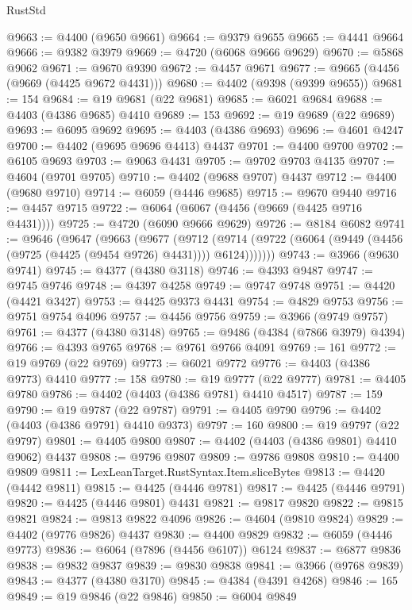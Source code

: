\begin{lexlean}{RustStd}
\begin{coremodule}
@9663 := @4400 (@9650 @9661)
@9664 := @9379 @9655
@9665 := @4441 @9664
@9666 := @9382 @3979
@9669 := @4720 (@6068 @9666 @9629)
@9670 := @5868 @9062
@9671 := @9670 @9390
@9672 := @4457 @9671
@9677 := @9665 (@4456 (@9669 (@4425 @9672 @4431)))
@9680 := @4402 (@9398 (@9399 @9655))
@9681 := 154
@9684 := @19 @9681 (@22 @9681)
@9685 := @6021 @9684
@9688 := @4403 (@4386 @9685) @4410
@9689 := 153
@9692 := @19 @9689 (@22 @9689)
@9693 := @6095 @9692
@9695 := @4403 (@4386 @9693)
@9696 := @4601 @4247
@9700 := @4402 (@9695 @9696 @4413) @4437
@9701 := @4400 @9700
@9702 := @6105 @9693
@9703 := @9063 @4431
@9705 := @9702 @9703 @4135
@9707 := @4604 (@9701 @9705)
@9710 := @4402 (@9688 @9707) @4437
@9712 := @4400 (@9680 @9710)
@9714 := @6059 (@4446 @9685)
@9715 := @9670 @9440
@9716 := @4457 @9715
@9722 := @6064 (@6067 (@4456 (@9669 (@4425 @9716 @4431))))
@9725 := @4720 (@6090 @9666 @9629)
@9726 := @8184 @6082
@9741 := @9646
    (@9647
      (@9663
        (@9677
          (@9712
            (@9714 (@9722 (@6064 (@9449 (@4456 (@9725 (@4425 (@9454 @9726) @4431)))) @6124)))))))
@9743 := @3966 (@9630 @9741)
@9745 := @4377 (@4380 @3118)
@9746 := @4393 @9487
@9747 := @9745 @9746
@9748 := @4397 @4258
@9749 := @9747 @9748
@9751 := @4420 (@4421 @3427)
@9753 := @4425 @9373 @4431
@9754 := @4829 @9753
@9756 := @9751 @9754 @4096
@9757 := @4456 @9756
@9759 := @3966 (@9749 @9757)
@9761 := @4377 (@4380 @3148)
@9765 := @9486 (@4384 (@7866 @3979) @4394)
@9766 := @4393 @9765
@9768 := @9761 @9766 @4091
@9769 := 161
@9772 := @19 @9769 (@22 @9769)
@9773 := @6021 @9772
@9776 := @4403 (@4386 @9773) @4410
@9777 := 158
@9780 := @19 @9777 (@22 @9777)
@9781 := @4405 @9780
@9786 := @4402 (@4403 (@4386 @9781) @4410 @4517)
@9787 := 159
@9790 := @19 @9787 (@22 @9787)
@9791 := @4405 @9790
@9796 := @4402 (@4403 (@4386 @9791) @4410 @9373)
@9797 := 160
@9800 := @19 @9797 (@22 @9797)
@9801 := @4405 @9800
@9807 := @4402 (@4403 (@4386 @9801) @4410 @9062) @4437
@9808 := @9796 @9807
@9809 := @9786 @9808
@9810 := @4400 @9809
@9811 := LexLeanTarget.RustSyntax.Item.sliceBytes
@9813 := @4420 (@4442 @9811)
@9815 := @4425 (@4446 @9781)
@9817 := @4425 (@4446 @9791)
@9820 := @4425 (@4446 @9801) @4431
@9821 := @9817 @9820
@9822 := @9815 @9821
@9824 := @9813 @9822 @4096
@9826 := @4604 (@9810 @9824)
@9829 := @4402 (@9776 @9826) @4437
@9830 := @4400 @9829
@9832 := @6059 (@4446 @9773)
@9836 := @6064 (@7896 (@4456 @6107)) @6124
@9837 := @6877 @9836
@9838 := @9832 @9837
@9839 := @9830 @9838
@9841 := @3966 (@9768 @9839)
@9843 := @4377 (@4380 @3170)
@9845 := @4384 (@4391 @4268)
@9846 := 165
@9849 := @19 @9846 (@22 @9846)
@9850 := @6004 @9849

\end{coremodule}
\end{lexlean}
